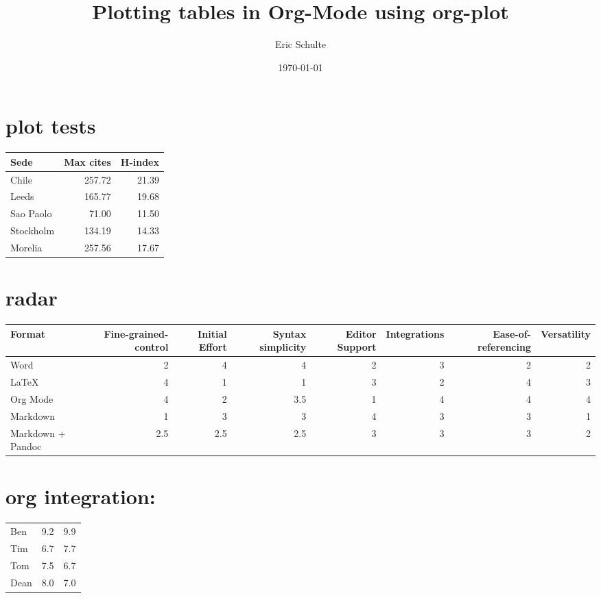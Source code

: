 \documentclass[11pt]{article}
\author{Eric Schulte}
\date{\today}
\title{Plotting tables in Org-Mode using org-plot}
\begin{document}
\maketitle
\tableofcontents

\section*{plot tests}
\label{sec:org1c8d14f}
\begin{center}
\begin{tabular}{lrr}
Sede & Max cites & H-index\\
\hline
Chile & 257.72 & 21.39\\
Leeds & 165.77 & 19.68\\
Sao Paolo & 71.00 & 11.50\\
Stockholm & 134.19 & 14.33\\
Morelia & 257.56 & 17.67\\
\end{tabular}
\end{center}

\section*{radar}
\label{sec:org873160c}
\begin{center}
\begin{tabular}{lrrrrrrr}
Format & Fine-grained-control & Initial Effort & Syntax simplicity & Editor Support & Integrations & Ease-of-referencing & Versatility\\
\hline
Word & 2 & 4 & 4 & 2 & 3 & 2 & 2\\
\LaTeX{} & 4 & 1 & 1 & 3 & 2 & 4 & 3\\
Org Mode & 4 & 2 & 3.5 & 1 & 4 & 4 & 4\\
Markdown & 1 & 3 & 3 & 4 & 3 & 3 & 1\\
Markdown + Pandoc & 2.5 & 2.5 & 2.5 & 3 & 3 & 3 & 2\\
\end{tabular}
\end{center}

\section*{org integration:}
\label{sec:org880d625}

\begin{table}[htbp]
\label{tab:orge79db4b}
\centering
\begin{tabular}{lrr}
Ben & 9.2 & 9.9\\
Tim & 6.7 & 7.7\\
Tom & 7.5 & 6.7\\
Dean & 8.0 & 7.0\\
\end{tabular}
\end{table}
\end{document}
